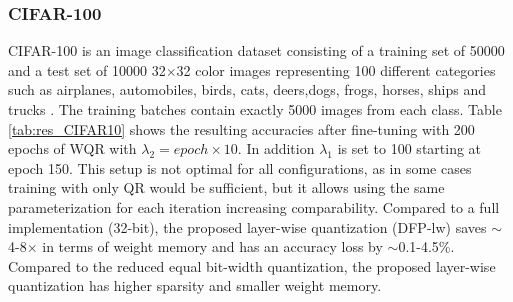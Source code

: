 \subsubsection{CIFAR-100}


CIFAR-100 is an image classification dataset consisting of a training set of 50000 and a test set of 10000 32$\times$32 color images representing 100 different categories such as airplanes, automobiles, birds, cats, deers,dogs, frogs, horses, ships and trucks \cite{Krizhevsky2009}. The training batches contain exactly 5000 images from each class. Table \ref{tab:res_CIFAR10} shows the resulting accuracies after fine-tuning with 200 epochs of WQR with $\lambda_2 = epoch\times 10$. In addition $\lambda_1$ is set to 100 starting at epoch 150. This setup is not optimal for all configurations, as in some cases training with only QR would be sufficient, but it allows using the same parameterization for each iteration increasing comparability. Compared to a full implementation (32-bit), the proposed layer-wise quantization (DFP-lw) saves $\sim$4-8$\times$ in terms of weight memory and has an accuracy loss by $\sim$0.1-4.5\%. Compared to the reduced equal bit-width quantization, the proposed layer-wise quantization has higher sparsity and smaller weight memory. 

